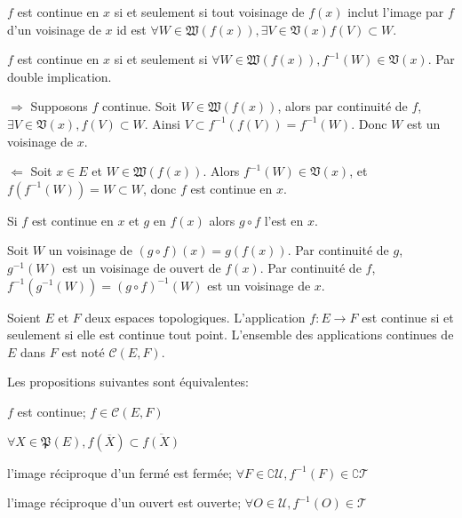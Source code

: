 \documentclass[a4paper, 11pt, french]{book}
\newenvironment{itemise}{\itemize}{\enditemize}
\theoremstyle{plain} %
\theoremstyle{definition} %
\theoremstyle{remark} %
\newcommand{\1}{\mathds{1}}
\newcommand{\cont}{\mathcal{C}}
\newcommand{\inv}[1]{#1^{-1}}
\begin{document}
$f$ est continue en $x$ si et seulement si tout voisinage de $f(x)$ inclut l'image par $f$ d'un voisinage de $x$ id est $\forall W\in\mathfrak{W}(f(x)), \exists V\in\mathfrak{V}(x) f(V)\subset W$.

\proposition
$f$ est continue en $x$ si et seulement si $\forall W\in\mathfrak{W}(f(x)), \inv{f}(W)\in\mathfrak{V}(x)$.
\demonstration
Par double implication.
\begin{itemise}
	\item[$\Rightarrow$] Supposons $f$ continue.
	Soit $W\in\mathfrak{W}(f(x))$, alors par continuité de $f$, $\exists V\in\mathfrak{V}(x), f(V)\subset W$.
	Ainsi $V\subset\inv{f}(f(V))=\inv{f}(W)$.
	Donc $W$ est un voisinage de $x$.
	\item[$\Leftarrow$] Soit $x\in E$ et $W\in\mathfrak{W}(f(x))$.
	Alors $\inv{f}(W)\in\mathfrak{V}(x)$, et $f(\inv{f}(W))=W\subset W$, donc $f$ est continue en $x$.
\end{itemise}

\proposition
Si $f$ est continue en $x$ et $g$ en $f(x)$ alors $g\circ f$ l'est en $x$.

\demonstration
Soit $W$ un voisinage de $(g\circ f)(x)=g(f(x))$.
Par continuité de $g$, $\inv{g}(W)$ est un voisinage de ouvert de $f(x)$.
Par continuité de $f$, $\inv{f}(\inv{g}(W))=\inv{(g\circ f)}(W)$ est un voisinage de $x$.

Soient $E$ et $F$ deux espaces topologiques.
L'application $f\colon E\rightarrow F$ est continue si et seulement si elle est continue tout point.
L'ensemble des applications continues de $E$ dans $F$ est noté $\mathcal{C}(E, F)$.

\proposition
Les propositions suivantes sont équivalentes:
\begin{itemise}
	\item $f$ est continue; $f\in\cont(E, F)$
	\item $\forall X\in\mathfrak{P}(E), f(\overline{X})\subset\overline{f(X)}$
	\item l'image réciproque d'un fermé est fermée; $\forall F\in\complement\mathscr{U}, \inv{f}(F)\in\complement\mathscr{T}$
	\item l'image réciproque d'un ouvert est ouverte; $\forall O\in\mathscr{U}, \inv{f}(O)\in\mathscr{T}$
\end{itemise}
\end{document}
